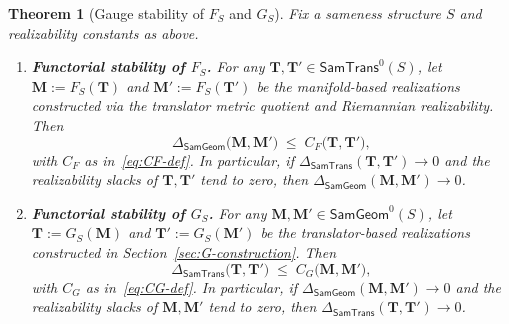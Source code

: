 \documentclass[11pt]{article}
\newtheorem{theorem}{Theorem}
\newcommand{\SamTrans}{\mathsf{SamTrans}}
\newcommand{\SamGeom}{\mathsf{SamGeom}}
\begin{document}
\begin{theorem}[Gauge stability of $F_S$ and $G_S$]
\label{thm:gauge-stability}
Fix a sameness structure $S$ and realizability constants as above.

\begin{enumerate}[]
\item \textbf{Functorial stability of $F_S$.}
For any $\mathbf{T},\mathbf{T}' \in \SamTrans^0(S)$, let
$\mathbf{M} := F_S(\mathbf{T})$ and
$\mathbf{M}' := F_S(\mathbf{T}')$ be the manifold-based realizations
constructed via the translator metric quotient and Riemannian
realizability.
Then
\begin{equation}
\label{eq:gauge-stability-F}
\Delta_{\SamGeom}\bigl(\mathbf{M}, \mathbf{M}'\bigr)
\;\le\;
C_F\bigl(\mathbf{T}, \mathbf{T}'\bigr),
\end{equation}
with $C_F$ as in~\eqref{eq:CF-def}. In particular, if
$\Delta_{\SamTrans}(\mathbf{T},\mathbf{T}') \to 0$ and the realizability
slacks of $\mathbf{T},\mathbf{T}'$ tend to zero, then
$\Delta_{\SamGeom}(\mathbf{M},\mathbf{M}') \to 0$.

\item \textbf{Functorial stability of $G_S$.}
For any $\mathbf{M},\mathbf{M}' \in \SamGeom^0(S)$, let
$\mathbf{T} := G_S(\mathbf{M})$ and
$\mathbf{T}' := G_S(\mathbf{M}')$ be the translator-based realizations
constructed in Section~\ref{sec:G-construction}. Then
\begin{equation}
\label{eq:gauge-stability-G}
\Delta_{\SamTrans}\bigl(\mathbf{T}, \mathbf{T}'\bigr)
\;\le\;
C_G\bigl(\mathbf{M}, \mathbf{M}'\bigr),
\end{equation}
with $C_G$ as in~\eqref{eq:CG-def}. In particular, if
$\Delta_{\SamGeom}(\mathbf{M},\mathbf{M}') \to 0$ and the realizability
slacks of $\mathbf{M},\mathbf{M}'$ tend to zero, then
$\Delta_{\SamTrans}(\mathbf{T},\mathbf{T}') \to 0$.
\end{enumerate}
\end{theorem}
\end{document}
